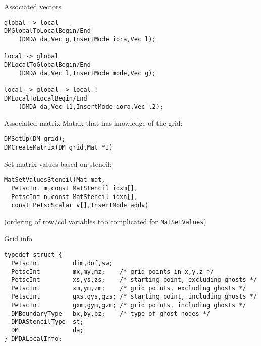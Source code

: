 \begin{longversion}
\begin{numberedframe}{Associated vectors}
\begin{lstlisting}
global -> local
DMGlobalToLocalBegin/End
    (DMDA da,Vec g,InsertMode iora,Vec l);

local -> global
DMLocalToGlobalBegin/End
    (DMDA da,Vec l,InsertMode mode,Vec g);

local -> global -> local :
DMLocalToLocalBegin/End
    (DMDA da,Vec l1,InsertMode iora,Vec l2);
\end{lstlisting}
\end{numberedframe}


\begin{numberedframe}{Associated matrix}
Matrix that has knowledge of the grid:
\begin{lstlisting}
DMSetUp(DM grid);
DMCreateMatrix(DM grid,Mat *J)
\end{lstlisting}
Set matrix values based on stencil:
\begin{lstlisting}
MatSetValuesStencil(Mat mat,
  PetscInt m,const MatStencil idxm[],
  PetscInt n,const MatStencil idxn[],
  const PetscScalar v[],InsertMode addv)
\end{lstlisting}
(ordering of row/col variables too complicated for \lstinline{MatSetValues})
\end{numberedframe}


\begin{numberedframe}{Grid info}
\begin{lstlisting}
typedef struct {
  PetscInt         dim,dof,sw;
  PetscInt         mx,my,mz;    /* grid points in x,y,z */
  PetscInt         xs,ys,zs;    /* starting point, excluding ghosts */
  PetscInt         xm,ym,zm;    /* grid points, excluding ghosts */
  PetscInt         gxs,gys,gzs; /* starting point, including ghosts */
  PetscInt         gxm,gym,gzm; /* grid points, including ghosts */
  DMBoundaryType   bx,by,bz;    /* type of ghost nodes */
  DMDAStencilType  st;
  DM               da;
} DMDALocalInfo;
\end{lstlisting}
\end{numberedframe}


\end{longversion}
